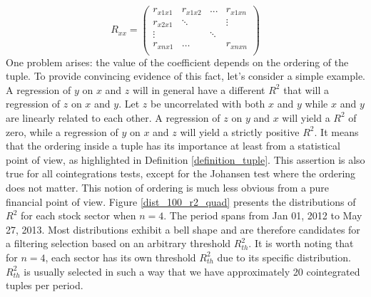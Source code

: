 \documentclass[11pt,a4,twosided,singlespacing,titlepagenumber=on]{scrreprt}
\numberwithin{equation}{chapter} %
\theoremstyle{remark}
\begin{document}
\begin{equation}
R_{xx} =\begin{pmatrix}
r_{x1x1}    & r_{x1x2} & ...  & r_{x1xn}  \\
r_{x2x1}    & \ddots &   & \vdots  \\
\vdots       &   & \ddots &   \\
r_{xnx1}    & \hdots &   & r_{xnxn} \\
\end{pmatrix} 
\end{equation}
One problem arises: the value of the coefficient depends on the ordering of the tuple. To provide convincing evidence of this fact, let's consider a simple example. A regression of $y$ on $x$ and $z$ will in general have a different $R^2$ that will a regression of $z$ on $x$ and $y$. Let $z$ be uncorrelated with both $x$ and $y$ while $x$ and $y$ are linearly related to each other. A regression of $z$ on $y$ and $x$ will yield a $R^2$ of zero, while a regression of $y$ on $x$ and $z$ will yield a strictly positive $R^2$. It means that the ordering inside a tuple has its importance at least from a statistical point of view, as highlighted in Definition \ref{definition_tuple}. This assertion is also true for all cointegrations tests, except for the Johansen test where the ordering does not matter. This notion of ordering is much less obvious from a pure financial point of view. Figure \ref{dist_100_r2_quad} presents the distributions of $R^2$ for each stock sector when $n=4$. The period spans from Jan 01, 2012 to May 27, 2013. Most distributions exhibit a bell shape and are therefore candidates for a filtering selection based on an arbitrary threshold $R^2_{th}$. It is worth noting that for $n=4$, each sector has its own threshold $R^2_{th}$ due to its specific distribution. $R^2_{th}$ is usually selected in such a way that we have approximately 20 cointegrated tuples per period.
\end{document}
